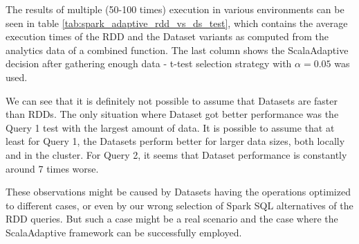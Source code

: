 The results of multiple (50-100 times) execution in various environments can be seen in table \ref{tab:spark_adaptive_rdd_vs_ds_test}, which contains the average execution times of the RDD and the Dataset variants as computed from the analytics data of a combined function. The last column shows the ScalaAdaptive decision after gathering enough data - t-test selection strategy with $\alpha = 0.05$ was used.

We can see that it is definitely not possible to assume that Datasets are faster than RDDs. The only situation where Dataset got better performance was the Query 1 test with the largest amount of data. It is possible to assume that at least for Query 1, the Datasets perform better for larger data sizes, both locally and in the cluster. For Query 2, it seems that Dataset performance is constantly around 7 times worse.

These observations might be caused by Datasets having the operations optimized to different cases, or even by our wrong selection of Spark SQL alternatives of the RDD queries. But such a case might be a real scenario and the case where the ScalaAdaptive framework can be successfully employed.

